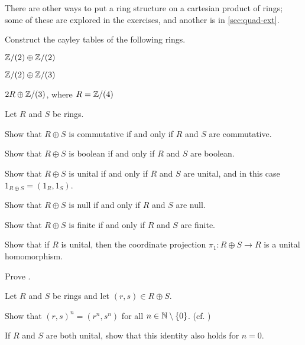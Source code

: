 There are other ways to put a ring structure on a cartesian product of rings; some of these are explored in the exercises, and another is in \autoref{sec:quad-ext}.



\Exercises%

\begin{exercise}
Construct the cayley tables of the following rings.
\begin{proplist*}
\item \(\mathbb{Z}/(2) \oplus \mathbb{Z}/(2)\)
\item \(\mathbb{Z}/(2) \oplus \mathbb{Z}/(3)\)
\item \(2R \oplus \mathbb{Z}/(3)\), where \(R = \mathbb{Z}/(4)\)
\end{proplist*}
\end{exercise}

\begin{exercise}
Let \(R\) and \(S\) be rings.
\begin{proplist*}
\item Show that \(R \oplus S\) is commutative if and only if \(R\) and \(S\) are commutative.
\item Show that \(R \oplus S\) is boolean if and only if \(R\) and \(S\) are boolean.
\item Show that \(R \oplus S\) is unital if and only if \(R\) and \(S\) are unital, and in this case \(1_{R \oplus S} = (1_R, 1_S)\).
\item Show that \(R \oplus S\) is null if and only if \(R\) and \(S\) are null.
\item Show that \(R \oplus S\) is finite if and only if \(R\) and \(S\) are finite.
\end{proplist*}
\end{exercise}

\begin{exercise}
Show that if \(R\) is unital, then the coordinate projection \(\pi_1 : R \oplus S \rightarrow R\) is a unital homomorphism.
\end{exercise}

\begin{exercise}
Prove .
\end{exercise}

\begin{exercise}
Let \(R\) and \(S\) be rings and let \((r,s) \in R \oplus S\).
\begin{proplist}
\item Show that \((r,s)^n = (r^n, s^n)\) for all \(n \in \mathbb{N} \setminus \{0\}\). (cf. )
\item If \(R\) and \(S\) are both unital, show that this identity also holds for \(n = 0\).
\end{proplist}
\end{exercise}

